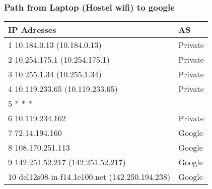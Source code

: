 \subsubsection*{Path from Laptop (Hostel wifi) to google}
\begin{table}[!ht]
    \centering
\begin{tabular}{|l|l|}
\hline
\textbf{IP Adresses}                                                        & \textbf{AS}                                                           \\ \hline
1  10.184.0.13 (10.184.0.13)                                                & Private                                                               \\ \hline
2  10.254.175.1 (10.254.175.1)                                              & Private                                                               \\ \hline
3  10.255.1.34 (10.255.1.34)                                                & Private                                                               \\ \hline
4  10.119.233.65 (10.119.233.65)                                            & Private                                                               \\ \hline
5  * * *                                                                    &                                                                       \\ \hline
6  10.119.234.162                                                           & Private                                                               \\ \hline
7  72.14.194.160                                                            & Google                                                                \\ \hline
8  108.170.251.113                                                          & Google                 \\ \hline
9  142.251.52.217 (142.251.52.217)                                          & Google                 \\ \hline
10  del12s08-in-f14.1e100.net (142.250.194.238)                             & Google  \\ \hline
\end{tabular}
\end{table}
